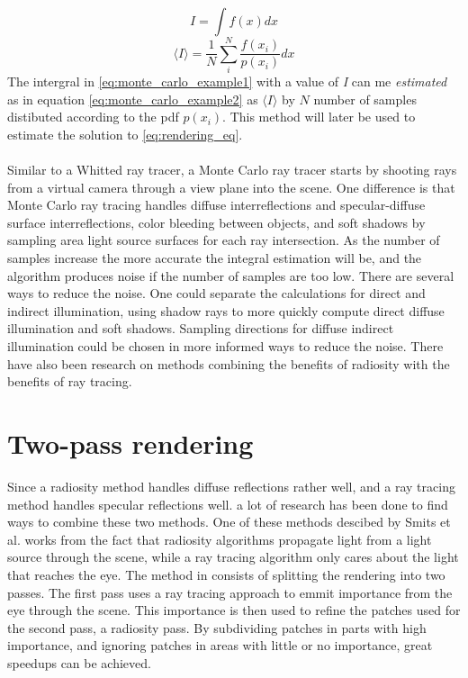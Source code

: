 \documentclass[]{report}   %
\begin{document}
\begin{equation}
\label{eq:monte_carlo_example1}
I = \int f(x) dx
\end{equation}
\begin{equation}
\label{eq:monte_carlo_example2}
\langle I \rangle = \frac{1}{N} \sum^N_i \frac{f(x_i)}{p(x_i)} dx
\end{equation}
The intergral in \autoref{eq:monte_carlo_example1} with a value of \emph{I} can me \emph{estimated} as in equation \autoref{eq:monte_carlo_example2} as $\langle I \rangle$ by $N$ number of samples distibuted according to the pdf $p(x_i)$. 
This method will later be used to estimate the solution to \autoref{eq:rendering_eq}.
\\ \\
Similar to a Whitted ray tracer, a Monte Carlo ray tracer starts by shooting rays from a virtual camera through a view plane into the scene. One difference is that Monte Carlo ray tracing handles diffuse interreflections and specular-diffuse surface interreflections, color bleeding between objects, and soft shadows by sampling area light source surfaces for each ray intersection. As the number of samples increase the more accurate the integral estimation will be, and the algorithm produces noise if the number of samples are too low. There are several ways to reduce the noise. One could separate the calculations for direct and indirect illumination, using shadow rays to more quickly compute direct diffuse illumination and soft shadows. Sampling directions for diffuse indirect illumination could be chosen in more informed ways to reduce the noise. There have also been research on methods combining the benefits of radiosity with the benefits of ray tracing.

\section{Two-pass rendering}
Since a radiosity method handles diffuse reflections rather well, and a ray tracing method handles specular reflections well. a lot of research has been done to find ways to combine these two methods.
One of these methods descibed by Smits et al. \cite{importance_radiosity} works from the fact that radiosity algorithms propagate light from a light source through the scene, while a ray tracing algorithm only cares about the light that reaches the eye.
The method in \cite{importance_radiosity} consists of splitting the rendering into two passes.
The first pass uses a ray tracing approach to emmit importance from the eye through the scene.
This importance is then used to refine the patches used for the second pass, a radiosity pass.
By subdividing patches in parts with high importance, and ignoring patches in areas with little or no importance, great speedups can be achieved.
 
\end{document}

